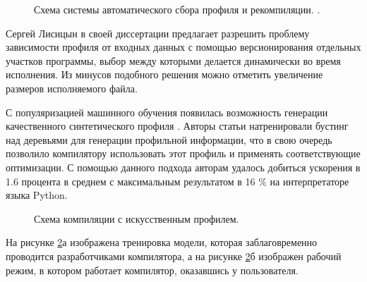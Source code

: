 \begin{figure}[ht]
	\caption{Схема системы автоматического сбора профиля и рекомпиляции. \cite{chen2016autofdo}.}\label{partReview:fdo2}
\end{figure}

Сергей Лисицын  в своей диссертации \cite{SergeyL1} предлагает разрешить проблему зависимости профиля от входных данных с помощью версионирования отдельных участков программы, выбор между которыми делается динамически во время исполнения. Из минусов подобного решения можно отметить увеличение размеров исполняемого файла.

С популяризацией машинного обучения появилась возможность генерации качественного синтетического профиля \cite{rotem2021profile}. Авторы статьи натренировали бустинг над деревьями для генерации профильной информации, что в свою очередь позволило компилятору использовать этот профиль и применять соответствующие оптимизации. С помощью данного подхода авторам удалось добиться ускорения в 1.6 процента в среднем с максимальным результатом в 16 \%  на интерпретаторе языка Python. 
 \begin{figure}[htbp]
	\centering
	
	\caption{Схема компиляции с искусственным профилем.}
	\label{partReview:pgo_without profile}
\end{figure}
На рисунке \ref{partReview:pgo_without profile}а изображена тренировка модели, которая заблаговременно проводится разработчиками компилятора, а на рисунке \ref{partReview:pgo_without profile}б изображен рабочий режим, в котором работает компилятор, оказавшись у пользователя.

\FloatBarrier
